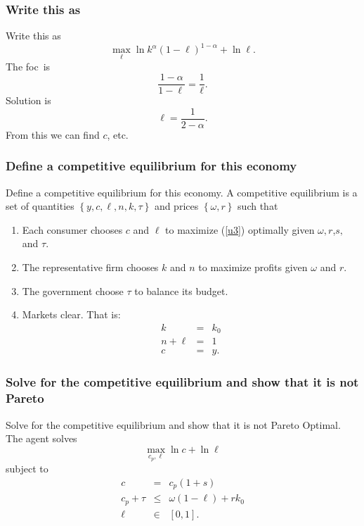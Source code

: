 \documentclass[aspectratio=169]{ltx-talk}
\begin{document}
\begin{frame}
\frametitle{Write this as}
Write this as%
\begin{equation*}
\underset{\ell }{\max }\ln k^{\alpha }\left( 1-\ell \right) ^{1-\alpha }+\ln
\ell .
\end{equation*}%
The foc\ is 
\begin{equation*}
\frac{1-\alpha }{1-\ell }=\frac{1}{\ell }.
\end{equation*}%
Solution is 
\begin{equation*}
\ell =\frac{1}{2-\alpha }.
\end{equation*}%
From this we can find $c$, etc.
\end{frame}

\begin{frame}
\frametitle{Define a competitive equilibrium for this economy}
Define a competitive equilibrium for this economy.\newline
A competitive equilibrium is a set of quantities $\left\{ y,c,\ell ,n,k,\tau
\right\} $ and prices $\left\{ \omega ,r\right\} $ such that

\begin{enumerate}
\item Each consumer chooses $c$ and $\ell $ to maximize (\ref{u3}) optimally
given $\omega ,r$,$s,$ and $\tau $.

\item The representative firm chooses $k$ and $n$ to maximize profits given $%
\omega $ and $r.$

\item The government choose $\tau $ to balance its budget.

\item Markets clear. That is:%
\begin{eqnarray*}
k &=&k_{0} \\
n+\ell &=&1 \\
c &=&y.
\end{eqnarray*}
\end{enumerate}
\end{frame}

\begin{frame}
\frametitle{Solve for the competitive equilibrium and show that it is not Pareto}
Solve for the competitive equilibrium and show that it is not Pareto
Optimal. The agent solves%
\begin{equation*}
\underset{c_{p},\ell }{\max }\ln c+\ln \ell
\end{equation*}%
subject to%
\begin{eqnarray*}
c &=&c_{p}\left( 1+s\right) \\
c_{p}+\tau &\leq &\omega \left( 1-\ell \right) +rk_{0} \\
\ell &\in &\left[ 0,1\right] .
\end{eqnarray*}%
\end{frame}
\end{document}
